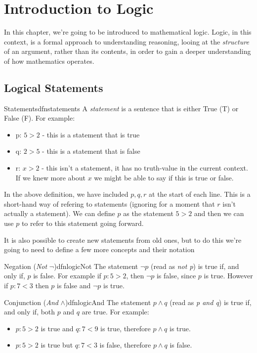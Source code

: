 \chapter{Introduction to Logic}
In this chapter, we're going to be introduced to mathematical logic. Logic, in this context, is a formal approach to understanding reasoning, looing at the \emph{structure} of an argument, rather than its contents, in order to gain a deeper understanding of how mathematics operates.

\section{Logical Statements}
\begin{dfn}[label={def:statements}]{Statements}{dfnstatements}
    A \emph{statement} is a sentence that is either True (T) or False (F). For example:
    \begin{itemize}
        \item p: $5 > 2$ - this is a statement that is true
        \item q: $2 > 5$ - this is a statement that is false
        \item r: $x > 2$ - this isn't a statement, it has no truth-value in the current context. If we knew more about $x$ we might be able to say if this is true or false.
    \end{itemize}
\end{dfn}

In the above definition, we have included $p,q,r$ at the start of each line. This is a short-hand way of refering to statements (ignoring for a moment that $r$ isn't actually a statement). We can define $p$ as the statement $5 > 2$ and then we can use $p$ to refer to this statement going forward.

It is also possible to create new statements from old ones, but to do this we're going to need to define a few more concepts and their notation

\begin{dfn}[label={def:logicNot}]{Negation (\emph{Not} $\lnot$)}{dfnlogicNot}
    The statement $\lnot p$ (read as \emph{not p}) is true if, and only if, $p$ is false. For example if $p: 5 > 2$, then $\lnot p$ is false, since $p$ is true. However if $p:7<3$ then $p$ is false and $\lnot p$ is true.
\end{dfn}

\begin{dfn}[label={def:logicAnd}]{Conjunction (\emph{And} $\land$)}{dfnlogicAnd}
    The statement $p \land q$ (read as \emph{p and q}) is true if, and only if, both $p$ and $q$ are true. For example:
    \begin{itemize}
        \item $p:5 > 2$ is true and $q: 7< 9$ is true, therefore $p \land q$ is true.
        \item $p:5 > 2$ is true but $q: 7< 3$ is false, therefore $p \land q$ is false.
    \end{itemize}
\end{dfn}

